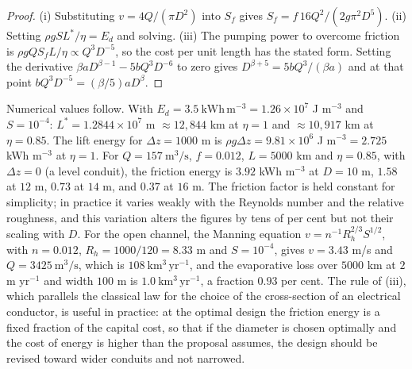 \begin{proof}
(i) Substituting $v=4Q/(\pi D^2)$ into $S_f$ gives $S_f=f\,16Q^2/(2g\pi^2D^5)$. (ii) Setting $\rho gSL^\ast/\eta=E_d$ and solving. (iii) The pumping power to overcome friction is $\rho gQS_fL/\eta\propto Q^3D^{-5}$, so the cost per unit length has the stated form. Setting the derivative $\beta aD^{\beta-1}-5bQ^3D^{-6}$ to zero gives $D^{\beta+5}=5bQ^3/(\beta a)$ and at that point $bQ^3D^{-5}=(\beta/5)aD^\beta$.
\end{proof}

Numerical values follow. With $E_d=3.5\ \mathrm{kWh\,m^{-3}}=1.26\times10^{7}$ J m$^{-3}$ and $S=10^{-4}$: $L^\ast=1.2844\times10^7$ m $\approx12{,}844$ km at $\eta=1$ and $\approx10{,}917$ km at $\eta=0.85$. The lift energy for $\Delta z=1000$ m is $\rho g\Delta z=9.81\times10^6$ J m$^{-3}=2.725$ kWh m$^{-3}$ at $\eta=1$. For $Q=157\ \mathrm{m^3/s}$, $f=0.012$, $L=5000$ km and $\eta=0.85$, with $\Delta z=0$ (a level conduit), the friction energy is $3.92$ kWh m$^{-3}$ at $D=10$ m, $1.58$ at $12$ m, $0.73$ at $14$ m, and $0.37$ at $16$ m. The friction factor is held constant for simplicity; in practice it varies weakly with the Reynolds number and the relative roughness, and this variation alters the figures by tens of per cent but not their scaling with $D$. For the open channel, the Manning equation $v=n^{-1}R_h^{2/3}S^{1/2}$, with $n=0.012$, $R_h=1000/120=8.33$ m and $S=10^{-4}$, gives $v=3.43$ m/s and $Q=3425\ \mathrm{m^3/s}$, which is $108\ \mathrm{km^3\,yr^{-1}}$, and the evaporative loss over $5000$ km at $2$ m yr$^{-1}$ and width $100$ m is $1.0\ \mathrm{km^3\,yr^{-1}}$, a fraction $0.93$ per cent. The rule of (iii), which parallels the classical law for the choice of the cross-section of an electrical conductor, is useful in practice: at the optimal design the friction energy is a fixed fraction of the capital cost, so that if the diameter is chosen optimally and the cost of energy is higher than the proposal assumes, the design should be revised toward wider conduits and not narrowed.
